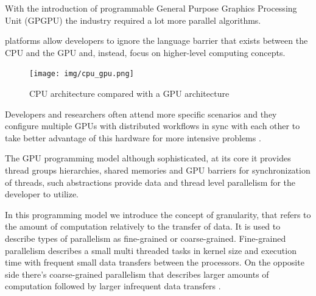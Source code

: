 \documentclass[
  oneside,
  11pt, a4paper,
  footinclude=true,
  headinclude=true,
  cleardoublepage=empty
]{scrbook}
\begin{document}
With the introduction of programmable General Purpose Graphics Processing Unit (GPGPU) the industry required a lot more parallel algorithms.



platforms allow developers to ignore the language barrier that exists between the CPU and the GPU and, instead, focus on higher-level computing concepts.

\begin{figure}[h]
    \centering
    \texttt{[image: img/cpu\_gpu.png]}
    \caption{CPU architecture compared with a GPU architecture}
    \label{fig:cpu-gpu}
\end{figure}

Developers and researchers often attend more specific scenarios and they configure multiple GPUs with distributed workflows in sync with each other to take better advantage of this hardware for more intensive problems \cite{heldens2022lightning}.

The GPU programming model although sophisticated, at its core it provides thread groups hierarchies, shared memories and GPU barriers for synchronization of threads, such abstractions provide data and thread level parallelism for the developer to utilize. \newline

In this programming model we introduce the concept of granularity, that refers to the amount of computation relatively to the transfer of data. It is used to describe types of parallelism as fine-grained or coarse-grained. 
Fine-grained parallelism describes a small multi threaded tasks in kernel size and execution time with frequent small data transfers between the processors. On the opposite side there's coarse-grained parallelism that describes larger amounts of computation followed by larger infrequent data transfers \cite{CUDAcppguide}.
\end{document}
